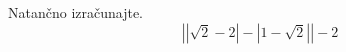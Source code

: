 \documentclass[addpoints]{exam}
\begin{document}
\begin{questions}






    \question
        Natančno izračunajte. $$\left|\left|\sqrt{2}-2\right|-\left|1-\sqrt{2}\right|\right|-2$$







\end{questions}
\end{document}
